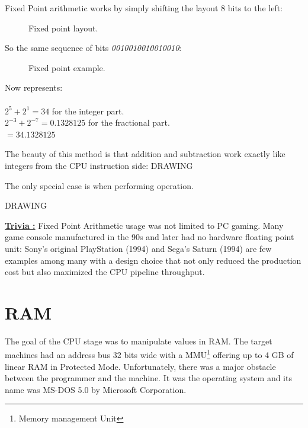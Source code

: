 \documentclass[book.tex]{subfiles}
\begin{document}
\bigskip

Fixed Point arithmetic works by simply shifting the layout 8 bits to the left:
\begin{figure}[H]
 \centering
  
 \caption{Fixed point layout.} \label{fig:mips}
\end{figure}

So the same sequence of bits \emph{0010010010010010}:
\begin{figure}[H]
 \centering
   
  \caption{Fixed point example.} \label{fig:mips}
\end{figure} 

Now represents:\\
\\
$ 2^5 + 2^1 = 34 $ for the integer part.\\
$ 2^{-3}+2^{-7} = 0.1328125 $ for the fractional part.\\
$ = 34.1328125$\\

\bigskip

The beauty of this method is that addition and subtraction work exactly like integers from the CPU instruction side:
  \bigskip
  DRAWING
  \bigskip


 The only special case is when performing operation.

\bigskip
  DRAWING
  \bigskip

 \textbf{\underline{Trivia :}}  Fixed Point Arithmetic usage was not limited to PC gaming. Many game console manufactured in the 90s and later had no hardware floating point unit: Sony's original PlayStation (1994) and Sega's Saturn (1994) are few examples among many with a design choice that not only reduced the production cost but also maximized the CPU pipeline throughput. 















\section{RAM}
The goal of the CPU stage was to manipulate values in RAM. The target machines had an address bus 32 bits wide with a MMU\footnote{Memory management Unit} offering up to 4 GB of linear RAM in Protected Mode. Unfortunately, there was a major obstacle between the programmer and the machine. It was the operating system and its name was MS-DOS 5.0 by Microsoft Corporation.
  
\end{document}
